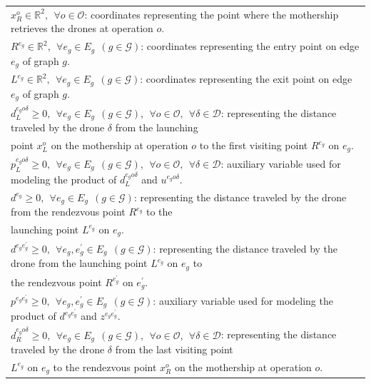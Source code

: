 \documentclass[10pt,a4paper]{elsarticle}
\begin{document}
\begin{table}[h!]
\begin{tabular}{|l|}
		$x_R^o\in\mathbb R^2, \:\: \forall o \in \mathcal O$: coordinates representing the point where the mothership retrieves the drones at operation $o$.\\
		$R^{e_g}\in\mathbb R^2, \:\: \forall e_g \in E_g\:\: (g \in \mathcal{G})$: coordinates representing the entry point on edge $e_g$ of graph $g$.\\
		$L^{e_g}\in\mathbb R^2, \:\: \forall e_g \in E_g\:\: (g \in \mathcal{G})$: coordinates representing the exit point on edge $e_g$ of graph $g$.\\
		$d_L^{e_go\delta} \geq 0, \:\: \forall e_g \in E_g\:\: (g \in \mathcal{G}),\:\: \forall o \in \mathcal O, \:\: \forall \delta\in\mathcal D$: representing the distance traveled by the drone $\delta$ from the launching\\
		\hspace*{1cm} point $x_L^o$ on the mothership at operation $o$ to the first visiting point $R^{e_g}$ on $e_g$.\\
		$p_L^{e_go\delta} \geq 0, \:\: \forall e_g \in E_g\:\: (g \in \mathcal{G}), \:\:\forall o \in \mathcal O, \:\:\forall \delta\in\mathcal D$: auxiliary variable used for modeling the product of $d_L^{e_go\delta}$ and $u^{e_go\delta}$.\\
		$d^{e_g} \geq 0, \:\: \forall e_g \in E_g \:\: (g \in \mathcal{G})$: representing the distance traveled by the drone from the rendezvous point $R^{e_g}$ to the \\
		\hspace*{1cm} launching point $L^{e_g}$ on $e_g$. \\
		$d^{e_ge^\prime_g} \geq 0, \:\: \forall e_g, e^\prime_g \in E_g \:\: (g \in \mathcal{G})$: representing the distance traveled by the drone from the launching point $L^{e_g}$ on $e_g$ to\\
		\hspace*{1cm}  the rendezvous point $R^{e^\prime_g}$ on $e^\prime_g$.\\
		$p^{e_ge^\prime_g} \geq 0, \:\: \forall e_g, e^\prime_g \in E_g \:\: (g \in \mathcal{G})$: auxiliary variable used for modeling the product of $d^{e_ge^\prime_g}$ and $z^{e_ge^\prime_g}$.\\
		$d_R^{e_go\delta} \geq 0, \:\: \forall e_g \in E_g\:\: (g \in \mathcal{G}), \:\: \forall o \in \mathcal O, \:\:\forall \delta\in\mathcal D$: representing the distance traveled by the drone $\delta$ from the last visiting point\\
		\hspace*{1cm} $L^{e_g}$ on $e_g$ to the rendezvous point $x_R^o$ on the mothership at operation $o$.\\

\end{tabular}
\end{table}
\end{document}
